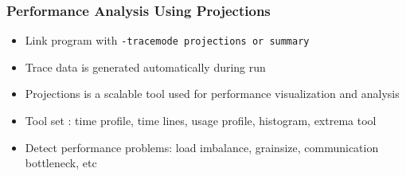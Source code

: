 \begin{frame}
  \frametitle{Performance Analysis Using Projections}
  \begin{itemize}

  \item Link program with {\tt -tracemode projections or summary}
  \item Trace data is generated automatically during run
  \item Projections is a scalable tool used for performance visualization and analysis
  \item Tool set : time profile, time lines, usage profile, histogram, extrema tool
  \item Detect performance problems: load imbalance, grainsize, communication bottleneck, etc 
  \end{itemize}

\end{frame}
